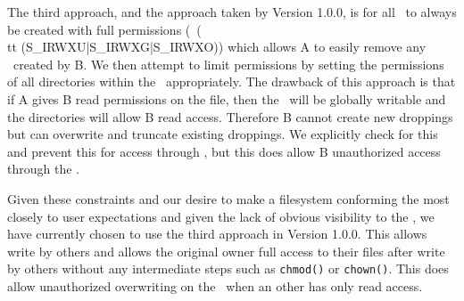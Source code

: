 \documentclass[10pt]{article}
\begin{document}
The third approach, and the approach taken by Version 1.0.0, is for all
\droppings\ to always be created with full permissions (\ie\ ({\\tt
 (S\_IRWXU|S\_IRWXG|S\_IRWXO)}) which allows A to easily remove any 
\droppings\ created by B.  We then attempt to limit permissions by
setting the permissions of all directories within the \container\ 
appropriately.  The drawback of this approach is that if A gives B read
permissions on the file, then the \droppings\ will be globally writable
and the directories will allow B read access.  Therefore B cannot 
create new droppings but can overwrite and truncate existing droppings.
We explicitly check for this and prevent this for access through \fuse,
but this does allow B unauthorized access through the \store.

Given these constraints and our desire to make a filesystem conforming
the most closely to user expectations and given the lack of obvious
visibility to the \store, we have currently chosen to use the third
approach in Version 1.0.0.  This allows write by others and allows
the original owner full access to their files after write by others
without any intermediate steps such as {\tt chmod()} or {\tt chown()}.
This does allow unauthorized overwriting on the \store\ when an other
has only read access.
\end{document}
